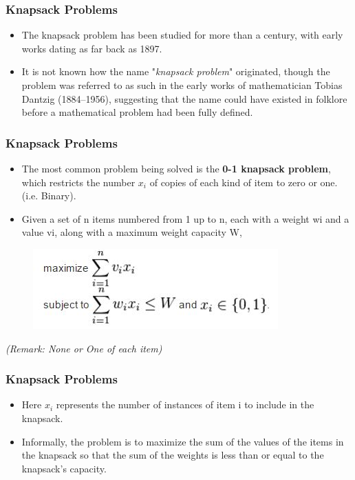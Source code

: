 \documentclass{beamer}
\begin{document}
\begin{frame}
	\frametitle{Knapsack Problems}
	\Large
	\begin{itemize}
\item The knapsack problem has been studied for more than a century, with early works dating as far back as 1897.
\item It is not known how the name "\textit{knapsack problem}" originated, though the problem was referred to as such in the early works of mathematician Tobias Dantzig (1884–1956), suggesting that the name could have existed in folklore before a mathematical problem had been fully defined.

\end{itemize}
\end{frame}

\begin{frame}
	\frametitle{Knapsack Problems}
	\Large
	\begin{itemize}
		\item The most common problem being solved is the \textbf{0-1 knapsack problem}, which restricts the number $x_i$ of copies of each kind of item to zero or one. (i.e. Binary).
		\item Given a set of n items numbered from 1 up to n, each with a weight wi and a value vi, along with a maximum weight capacity W,
	\end{itemize}
	\begin{figure}
		\centering
		\includegraphics[width=0.7\linewidth]{01knapsack}
	\end{figure}
\textit{(Remark: None or One of each item)}
\end{frame}
\begin{frame}
	\frametitle{Knapsack Problems}
	\Large
	\begin{itemize}
\item	Here $x_i$ represents the number of instances of item i to include in the knapsack. 
\item Informally, the problem is to maximize the sum of the values of the items in the knapsack so that the sum of the weights is less than or equal to the knapsack's capacity.
	\end{itemize}

\end{frame}
\end{document}
